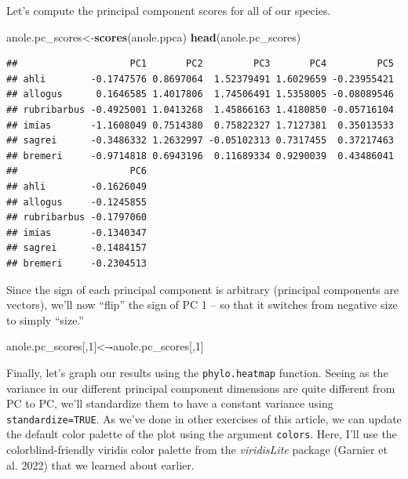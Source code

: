 \documentclass[fleqn,10pt,lineno]{wlpeerj} %
\newenvironment{Shaded}{\begin{snugshade}}{\end{snugshade}}
\newcommand{\DecValTok}[1]{\textcolor[rgb]{0.00,0.00,0.81}{#1}}
\newcommand{\FunctionTok}[1]{\textcolor[rgb]{0.13,0.29,0.53}{\textbf{#1}}}
\newcommand{\NormalTok}[1]{#1}
\newcommand{\OtherTok}[1]{\textcolor[rgb]{0.56,0.35,0.01}{#1}}
\newcommand{\SpecialCharTok}[1]{\textcolor[rgb]{0.81,0.36,0.00}{\textbf{#1}}}
\begin{document}
Let's compute the principal component scores for all of our species.

\begin{Shaded}
\begin{Highlighting}[]
\NormalTok{anole.pc\_scores}\OtherTok{\textless{}{-}}\FunctionTok{scores}\NormalTok{(anole.ppca)}
\FunctionTok{head}\NormalTok{(anole.pc\_scores)}
\end{Highlighting}
\end{Shaded}

\begin{verbatim}
##                    PC1       PC2         PC3       PC4         PC5
## ahli        -0.1747576 0.8697064  1.52379491 1.6029659 -0.23955421
## allogus      0.1646585 1.4017806  1.74506491 1.5358005 -0.08089546
## rubribarbus -0.4925001 1.0413268  1.45866163 1.4180850 -0.05716104
## imias       -1.1608049 0.7514380  0.75822327 1.7127381  0.35013533
## sagrei      -0.3486332 1.2632997 -0.05102313 0.7317455  0.37217463
## bremeri     -0.9714818 0.6943196  0.11689334 0.9290039  0.43486041
##                    PC6
## ahli        -0.1626049
## allogus     -0.1245855
## rubribarbus -0.1797060
## imias       -0.1340347
## sagrei      -0.1484157
## bremeri     -0.2304513
\end{verbatim}

Since the sign of each principal component is arbitrary (principal components are vectors), we'll now ``flip'' the sign of PC 1 -- so that it switches from negative size to simply ``size.''

\begin{Shaded}
\begin{Highlighting}[]
\NormalTok{anole.pc\_scores[,}\DecValTok{1}\NormalTok{]}\OtherTok{\textless{}{-}}\SpecialCharTok{{-}}\NormalTok{anole.pc\_scores[,}\DecValTok{1}\NormalTok{]}
\end{Highlighting}
\end{Shaded}

Finally, let's graph our results using the \texttt{phylo.heatmap} function. Seeing as the variance in our different principal component dimensions are quite different from PC to PC, we'll standardize them to have a constant variance using \texttt{standardize=TRUE}. As we've done in other exercises of this article, we can update the default color palette of the plot using the argument \texttt{colors}. Here, I'll use the colorblind-friendly viridis color palette from the \emph{viridisLite} package (Garnier et al. 2022) that we learned about earlier.
\end{document}
